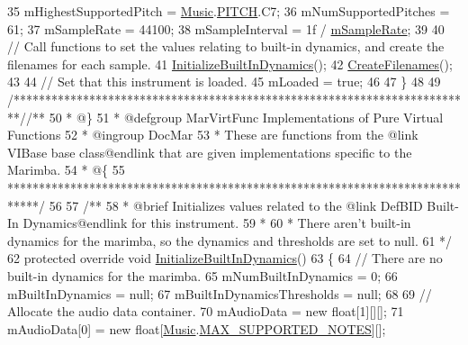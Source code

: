 \begin{DoxyCodeInclude}
35         mHighestSupportedPitch = \hyperlink{class_music}{Music}.\hyperlink{group___music_enums_ga508f69b199ea518f935486c990edac1d}{PITCH}.C7;
36         mNumSupportedPitches = 61;
37         mSampleRate = 44100;
38         mSampleInterval = 1f / \hyperlink{group___v_i_base_pro_var_ga80b3d2ff29b27698eea6bcf2f8ddc5d7}{mSampleRate};
39 
40         \textcolor{comment}{// Call functions to set the values relating to built-in dynamics, and create the filenames for
       each sample.}
41         \hyperlink{group___mar_virt_func_ga293d829cb8571c21452c23e90968b2d8}{InitializeBuiltInDynamics}();
42         \hyperlink{group___mar_virt_func_gae57d9737fd07708dc7e13e74ee777878}{CreateFilenames}();
43 
44         \textcolor{comment}{// Set that this instrument is loaded.}
45         mLoaded = \textcolor{keyword}{true};
46 
47     \}
48     
49     \textcolor{comment}{/*************************************************************************/}\textcolor{comment}{/** }
50 \textcolor{comment}{    * @\}}
51 \textcolor{comment}{    * @defgroup MarVirtFunc Implementations of Pure Virtual Functions}
52 \textcolor{comment}{    * @ingroup DocMar}
53 \textcolor{comment}{    * These are functions from the @link VIBase base class@endlink that are given implementations specific
       to the Marimba.}
54 \textcolor{comment}{    * @\{}
55 \textcolor{comment}{    *****************************************************************************/}
56 \textcolor{comment}{}
57 \textcolor{comment}{    /**}
58 \textcolor{comment}{     * @brief Initializes values related to the @link DefBID Built-In Dynamics@endlink for this instrument.}
59 \textcolor{comment}{     * }
60 \textcolor{comment}{     * There aren't built-in dynamics for the marimba, so the dynamics and thresholds are set to null.}
61 \textcolor{comment}{    */}
62     \textcolor{keyword}{protected} \textcolor{keyword}{override} \textcolor{keywordtype}{void} \hyperlink{group___mar_virt_func_ga293d829cb8571c21452c23e90968b2d8}{InitializeBuiltInDynamics}()
63     \{
64         \textcolor{comment}{// There are no built-in dynamics for the marimba.}
65         mNumBuiltInDynamics = 0;
66         mBuiltInDynamics = null;
67         mBuiltInDynamicsThresholds = null;
68 
69         \textcolor{comment}{// Allocate the audio data container.}
70         mAudioData = \textcolor{keyword}{new} \textcolor{keywordtype}{float}[1][][];
71         mAudioData[0] = \textcolor{keyword}{new} \textcolor{keywordtype}{float}[\hyperlink{class_music}{Music}.\hyperlink{group___music_constants_gaaf07da909a12e9fec0e43b70864f27b7}{MAX\_SUPPORTED\_NOTES}][];

\end{DoxyCodeInclude}
